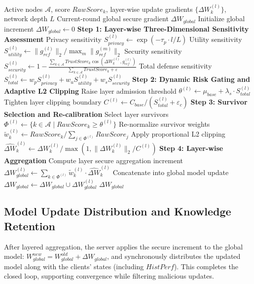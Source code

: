 \documentclass[runningheads,orivec]{llncs}
\begin{document}
\begin{algorithm}[htbp]
    \caption{Risk-gated layered differentiated aggregation and dynamic clipping}
    \label{alg:phase4}
    \begin{algorithmic}[1]
        \REQUIRE Active nodes $\mathcal{A}$, score $RawScore_k$, layer-wise update gradients $\{\Delta W_k^{(l)}\}$, network depth $L$
        \ENSURE Current-round global secure gradient $\Delta W_{global}$
        \STATE Initialize global increment $\Delta W_{global} \leftarrow 0$
        \STATE \textbf{Step 1: Layer-wise Three-Dimensional Sensitivity Assessment}
        \STATE Privacy sensitivity $S_{privacy}^{(l)} \leftarrow \exp(-\tau_p \cdot l/L)$
        \STATE Utility sensitivity $S_{utility}^{(l)} \leftarrow \|g_{ref}^{(l)}\|_2 / \max_m\|g_{ref}^{(m)}\|_2$
        \STATE Security sensitivity $S_{security}^{(l)} \leftarrow 1 - \frac{\sum_{k\in\mathcal{A}} TrustScore_k \cos(\Delta W_k^{(l)}, g_{ref}^{(l)})}{\sum_{k\in\mathcal{A}} TrustScore_k + \varepsilon}$
        \STATE Total defense sensitivity $S_{total}^{(l)} \leftarrow w_p S_{privacy}^{(l)} + w_u S_{utility}^{(l)} + w_s S_{security}^{(l)}$
        \STATE \textbf{Step 2: Dynamic Risk Gating and Adaptive L2 Clipping}
        \STATE Raise layer admission threshold $\theta^{(l)} \leftarrow \mu_{base} + \lambda_s \cdot S_{total}^{(l)}$
        \STATE Tighten layer clipping boundary $C^{(l)} \leftarrow C_{base} / (S_{total}^{(l)} + \varepsilon_c)$
        \STATE \textbf{Step 3: Survivor Selection and Re-calibration}
        \STATE Select layer survivors $\Phi^{(l)} \leftarrow \{k \in \mathcal{A} \mid RawScore_k \ge \theta^{(l)}\}$
        \STATE Re-normalize survivor weights $\tilde{w}_k^{(l)} \leftarrow RawScore_k / \sum_{j\in\Phi^{(l)}} RawScore_j$
        \STATE Apply proportional L2 clipping $\widehat{\Delta W}_k^{(l)} \leftarrow \Delta W_k^{(l)} / \max(1, \|\Delta W_k^{(l)}\|_2 / C^{(l)})$
        \STATE \textbf{Step 4: Layer-wise Aggregation}
        \STATE Compute layer secure aggregation increment $\Delta W_{global}^{(l)} \leftarrow \sum_{k\in\Phi^{(l)}} \tilde{w}_k^{(l)} \cdot \widehat{\Delta W}_k^{(l)}$
        \STATE Concatenate into global model update $\Delta W_{global} \leftarrow \Delta W_{global} \cup \Delta W_{global}^{(l)}$
        \ENDFOR
        \RETURN $\Delta W_{global}$
    \end{algorithmic}
\end{algorithm}

\subsection{Model Update Distribution and Knowledge Retention}
After layered aggregation, the server applies the secure increment to the global model: $W_{global}^{new} = W_{global}^{old} + \Delta W_{global}$, and synchronously distributes the updated model along with the clients' states (including $HistPerf$). This completes the closed loop, supporting convergence while filtering malicious updates.
\end{document}
